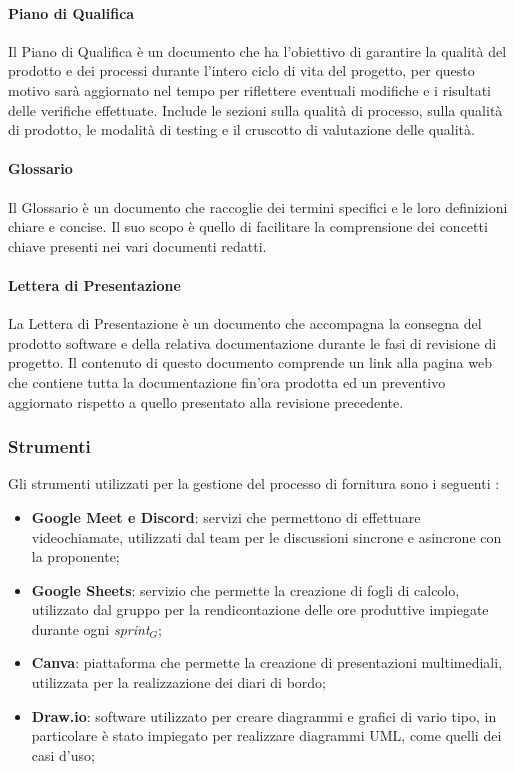     \paragraph{Piano di Qualifica}
    Il Piano di Qualifica è un documento che ha l'obiettivo di garantire la qualità del prodotto e dei processi durante l'intero ciclo di vita del progetto, per questo motivo sarà aggiornato nel tempo per riflettere eventuali modifiche e i risultati delle verifiche effettuate. Include le sezioni sulla qualità di processo, sulla qualità di prodotto, le modalità di testing e il cruscotto di valutazione delle qualità.\\

    \paragraph{Glossario}
    Il Glossario è un documento che raccoglie dei termini specifici e le loro definizioni chiare e concise. Il suo scopo è quello di facilitare la comprensione dei concetti chiave presenti nei vari documenti redatti.\\

    \paragraph{Lettera di Presentazione}
    La Lettera di Presentazione è un documento che accompagna la consegna del prodotto software e della relativa documentazione durante le fasi di revisione di progetto. Il contenuto di questo documento comprende un link alla pagina web che contiene tutta la documentazione fin'ora prodotta ed un preventivo aggiornato rispetto a quello presentato alla revisione precedente.\\

\subsubsection{Strumenti}
 Gli strumenti utilizzati per la gestione del processo di fornitura sono i seguenti :
 \begin{itemize}
    \item \textbf{Google Meet e Discord}: servizi che permettono di effettuare videochiamate, utilizzati dal team per le discussioni sincrone e asincrone con la proponente;
    \item \textbf{Google Sheets}: servizio che permette la creazione di fogli di calcolo, utilizzato dal gruppo per la rendicontazione delle ore produttive impiegate durante ogni \textit{sprint}$_G$;
    \item \textbf{Canva}: piattaforma che permette la creazione di presentazioni multimediali, utilizzata per la realizzazione dei diari di bordo;
    \item \textbf{Draw.io}: software utilizzato per creare diagrammi e grafici di vario tipo, in particolare è stato impiegato per realizzare diagrammi UML, come quelli dei casi d’uso;
 \end{itemize}